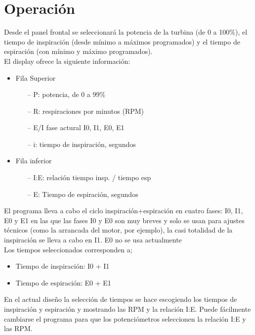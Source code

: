 \section{Operación}
    Desde el panel frontal se seleccionará la potencia de la turbina (de 0 a 100\%), el tiempo de inspiración (desde mínimo a máximos programados) y el tiempo de espiración (con mínimo y máximo programados).\\
    El display ofrece la siguiente información:
    \begin{itemize}
        \item Fila Superior
        \begin{itemize}
            \item[--] P: potencia, de 0 a 99\%
            \item[--] R: respiraciones por minutos (RPM)
            \item[--] E/I fase actural I0, I1, E0, E1
            \item[--] i: tiempo de inspiración, segundos
        \end{itemize}
        \item Fila inferior
        \begin{itemize}
            \item[--] I:E: relación tiempo insp. / tiempo esp
            \item[--] E: Tiempo de espiración, segundos
        \end{itemize}
    \end{itemize}
    
    El programa lleva a cabo el ciclo inspiración+espiración en cuatro fases: I0, I1, E0 y E1 en las que las fases I0 y E0 son muy breves y solo se usan para ajustes técnicos (como la arrancada del motor, por ejemplo), la casi totalidad de la inspiración se lleva a cabo en I1. E0 no se usa actualmente\\
    
    Los tiempos seleccionados corresponden a;
    \begin{itemize}
        \item Tiempo de inspiración: I0 + I1
        \item Tiempo de espiración: E0 + E1
    \end{itemize}
    
    En el actual diseño la selección de tiempos se hace escogiendo los tiempos de inspiración y espiración y mostrando las RPM y la relación I:E. Puede fácilmente cambiarse el programa para que los potenciómetros seleccionen la relación I:E y las RPM.